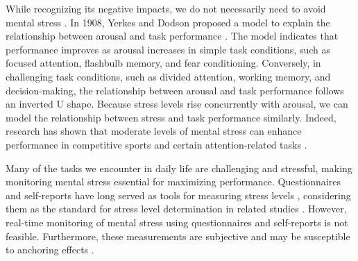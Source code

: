 \documentclass[journal]{IEEEtran}
\begin{document}
While recognizing its negative impacts, we do not necessarily need to avoid mental stress \cite{selye1976stress_is_not_bad}.
In 1908, Yerkes and Dodson proposed a model to explain the relationship between arousal and task performance \cite{yerkes1908stress_principle, staal2004stress_curve}.
 The model indicates that performance improves as arousal increases in simple task conditions, such as focused attention, flashbulb memory, and fear conditioning. Conversely, in challenging task conditions, such as divided attention, working memory, and decision-making, the relationship between arousal and task performance follows an inverted U shape.
Because stress levels rise concurrently with arousal, we can model the relationship between stress and task performance similarly. Indeed, research has shown that moderate levels of mental stress can enhance performance in competitive sports\cite{jones1989stress_sport} and certain attention-related tasks \cite{staal2004stress_curve}.



Many of the tasks we encounter in daily life are challenging and stressful, making monitoring mental stress essential for maximizing performance. Questionnaires and self-reports have long served as tools for measuring stress levels \cite{cahir1991PSSQ_stress_questionnaire, crandall1992USQ_stress_questionnaire, levenstein1993perceived_stress_questionnaire, lovibond1995_dass21}, considering them as the standard for stress level determination in related studies \cite{rissen2000stress_EMG_selfreport, lopez2012stress_frontal_asymmetry_selfreport, blackhart2006stress_frontal_asymmetry_selfreport}.
However, real-time monitoring of mental stress using questionnaires and self-reports is not feasible. Furthermore, these measurements are subjective and may be susceptible to anchoring effects  \cite{paulhus2007self-report-guide}.
\end{document}

